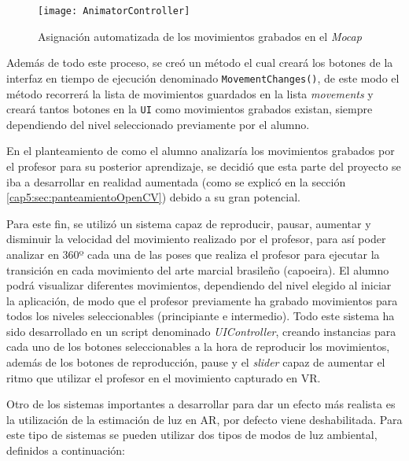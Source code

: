 \begin{figure}[h!]
    \centering 
    \texttt{[image: AnimatorController]}
    \caption{Asignación automatizada de los movimientos grabados en el \textit{Mocap}}
    \label{fig:AnimatorController}
\end{figure} 

Además de todo este proceso, se creó un método el cual creará los botones de la interfaz en tiempo de ejecución denominado \texttt{MovementChanges()}, de este modo el método recorrerá la lista de movimientos guardados en la lista \textit{movements} y creará tantos botones en la \texttt{UI} como movimientos grabados existan, siempre dependiendo del nivel seleccionado previamente por el alumno.

En el planteamiento de como el alumno analizaría los movimientos grabados por el profesor para su posterior aprendizaje, se decidió que esta parte del proyecto se iba a desarrollar en realidad aumentada (como se explicó en la sección \ref{cap5:sec:panteamientoOpenCV}) debido a su gran potencial. 

Para este fin, se utilizó un sistema capaz de reproducir, pausar, aumentar y disminuir la velocidad del movimiento realizado por el profesor, para así poder analizar en 360º cada una de las poses que realiza el profesor para ejecutar la transición en cada movimiento del arte marcial brasileño (capoeira). El alumno podrá visualizar diferentes movimientos, dependiendo del nivel elegido al iniciar la aplicación, de modo que el profesor previamente ha grabado movimientos para todos los niveles seleccionables (principiante e intermedio). Todo este sistema ha sido desarrollado en un script denominado \textit{UIController}, creando instancias para cada uno de los botones seleccionables a la hora de reproducir los movimientos, además de los botones de reproducción, pause y el \textit{slider} capaz de aumentar el ritmo que utilizar el profesor en el movimiento capturado en VR.



Otro de los sistemas importantes a desarrollar para dar un efecto más realista es la utilización de la estimación de luz en AR, por defecto viene deshabilitada. Para este tipo de sistemas se pueden utilizar dos tipos de modos de luz ambiental, definidos a continuación:

